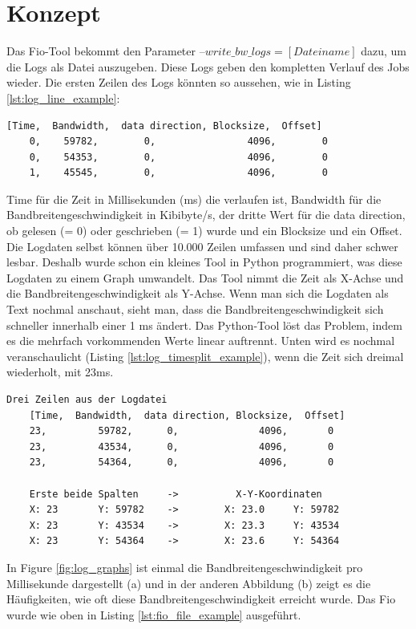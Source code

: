 \documentclass{article}
\begin{document}
\section{Konzept}
Das Fio-Tool bekommt den Parameter $\text{--} write\_bw\_logs = [Dateiname]$ dazu, um die Logs als Datei auszugeben.
Diese Logs geben den kompletten Verlauf des Jobs wieder. Die ersten Zeilen des Logs könnten so aussehen, wie in Listing \ref{lst:log_line_example}:
\bigskip
\begin{lstlisting}[caption=Erste Zeilen des Logs (Bezeichnungen sind nicht im Log enthalten),label={lst:log_line_example}]
    [Time,	Bandwidth,  data direction, Blocksize,	Offset]
    0, 	  59782,        0,		          4096,		   0
    0, 	  54353,        0,		          4096,		   0
    1, 	  45545,        0,		          4096,		   0
\end{lstlisting}
\bigskip
Time für die Zeit in Millisekunden (ms) die verlaufen ist, Bandwidth für die Bandbreitengeschwindigkeit in Kibibyte/s, 
der dritte Wert für die data direction, ob gelesen (= 0) oder geschrieben (= 1) wurde und ein Blocksize
und ein Offset. Die Logdaten selbst können über 10.000 Zeilen umfassen und sind daher schwer lesbar. Deshalb wurde schon ein kleines Tool in Python programmiert,
was diese Logdaten zu einem Graph umwandelt. 
Das Tool nimmt die Zeit als X-Achse und die Bandbreitengeschwindigkeit als Y-Achse.
Wenn man sich die Logdaten als Text nochmal anschaut, sieht man, dass die Bandbreitengeschwindigkeit sich schneller innerhalb einer 1 ms ändert.
Das Python-Tool löst das Problem, indem es die mehrfach vorkommenden Werte linear auftrennt.
Unten wird es nochmal veranschaulicht (Listing \ref{lst:log_timesplit_example}), wenn die Zeit sich dreimal wiederholt, mit 23ms.
\bigskip
\begin{lstlisting}[caption={Aufsplitten der Zeit um ein Grafik zu bilden}, label={lst:log_timesplit_example}]
    Drei Zeilen aus der Logdatei
    [Time,	Bandwidth,	data direction, Blocksize,	Offset]
    23, 	    59782, 		0,		        4096,		0
    23, 	    43534, 		0,		        4096,		0
    23, 	    54364, 		0,		        4096,		0

    Erste beide Spalten     ->          X-Y-Koordinaten
    X: 23       Y: 59782    ->        X: 23.0     Y: 59782
    X: 23       Y: 43534    ->        X: 23.3     Y: 43534
    X: 23       Y: 54364    ->        X: 23.6     Y: 54364
\end{lstlisting}
\bigskip
In Figure \ref{fig:log_graphs}  ist einmal die Bandbreitengeschwindigkeit pro Millisekunde dargestellt (a) und in der anderen Abbildung (b) zeigt es die Häufigkeiten, 
wie oft diese Bandbreitengeschwindigkeit erreicht wurde. Das Fio wurde wie oben in Listing \ref{lst:fio_file_example} ausgeführt.
\newpage
\end{document}
